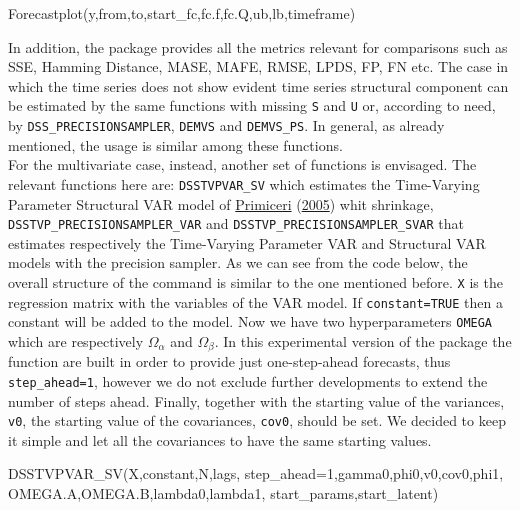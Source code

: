 \documentclass[
  12pt,
]{book}
\newenvironment{Shaded}{\begin{snugshade}}{\end{snugshade}}
\newcommand{\AttributeTok}[1]{\textcolor[rgb]{0.77,0.63,0.00}{#1}}
\newcommand{\DecValTok}[1]{\textcolor[rgb]{0.00,0.00,0.81}{#1}}
\newcommand{\FunctionTok}[1]{\textcolor[rgb]{0.00,0.00,0.00}{#1}}
\newcommand{\NormalTok}[1]{#1}
\theoremstyle{break}
\theoremstyle{nonumberplain}
\begin{document}
\begin{Shaded}
\begin{Highlighting}[]
\FunctionTok{Forecastplot}\NormalTok{(y,from,to,start\_fc,fc.f,fc.Q,ub,lb,timeframe)}
\end{Highlighting}
\end{Shaded}

In addition, the package provides all the metrics relevant for
comparisons such as SSE, Hamming Distance, MASE, MAFE, RMSE, LPDS, FP,
FN etc. The case in which the time series does not show evident time
series structural component can be estimated by the same functions with
missing \texttt{S} and \texttt{U} or, according to need, by
\texttt{DSS\_PRECISIONSAMPLER}, \texttt{DEMVS} and \texttt{DEMVS\_PS}.
In general, as already mentioned, the usage is similar among these
functions.\\
For the multivariate case, instead, another set of functions is
envisaged. The relevant functions here are: \texttt{DSSTVPVAR\_SV} which
estimates the Time-Varying Parameter Structural VAR model of
\protect\hyperlink{ref-Primicieri_2005}{Primiceri}
(\protect\hyperlink{ref-Primicieri_2005}{2005}) whit shrinkage,
\texttt{DSSTVP\_PRECISIONSAMPLER\_VAR} and
\texttt{DSSTVP\_PRECISIONSAMPLER\_SVAR} that estimates respectively the
Time-Varying Parameter VAR and Structural VAR models with the precision
sampler. As we can see from the code below, the overall structure of the
command is similar to the one mentioned before. \texttt{X} is the
regression matrix with the variables of the VAR model. If
\texttt{constant=TRUE} then a constant will be added to the model. Now
we have two hyperparameters \texttt{OMEGA} which are respectively
\(\Omega_\alpha\) and \(\Omega_\beta\). In this experimental version of
the package the function are built in order to provide just
one-step-ahead forecasts, thus \texttt{step\_ahead=1}, however we do not
exclude further developments to extend the number of steps ahead.
Finally, together with the starting value of the variances, \texttt{v0},
the starting value of the covariances, \texttt{cov0}, should be set. We
decided to keep it simple and let all the covariances to have the same
starting values.

\begin{Shaded}
\begin{Highlighting}[]
\FunctionTok{DSSTVPVAR\_SV}\NormalTok{(X,constant,N,lags,}
             \AttributeTok{step\_ahead=}\DecValTok{1}\NormalTok{,gamma0,phi0,v0,cov0,phi1,}
\NormalTok{             OMEGA.A,OMEGA.B,lambda0,lambda1,}
\NormalTok{             start\_params,start\_latent)}
\end{Highlighting}
\end{Shaded}
\end{document}
